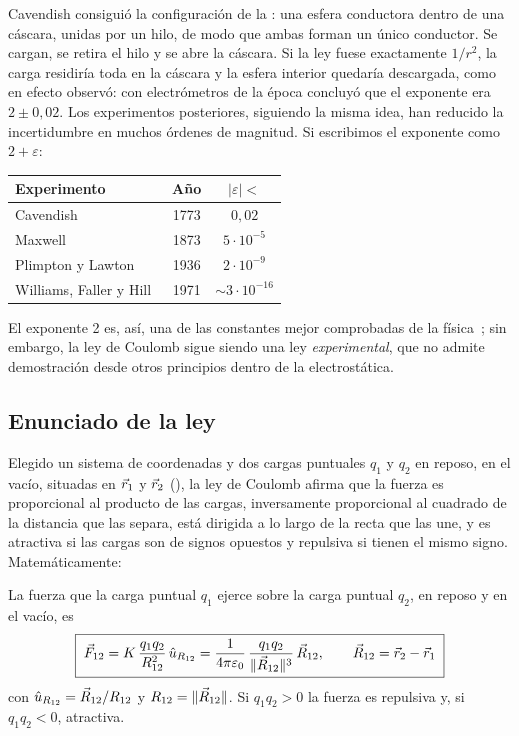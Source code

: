Cavendish consiguió la configuración de la : una esfera conductora dentro de
una cáscara, unidas por un hilo, de modo que ambas forman un único conductor. Se cargan, se retira
el hilo y se abre la cáscara. Si la ley fuese exactamente $1/r^{2}$, la carga residiría
toda en la cáscara y la esfera interior quedaría descargada, como en efecto observó: con electrómetros de
la época concluyó que el exponente era $2\pm0{,}02$. Los experimentos posteriores, siguiendo la misma idea, han
reducido la incertidumbre en muchos órdenes de magnitud. Si escribimos el exponente como $2+\varepsilon$:
\begin{center}\small
\renewcommand{\arraystretch}{1.25}
\begin{tabular}{@{}lcc@{}}
\toprule
Experimento & Año & $\lvert\varepsilon\rvert<$\\
\midrule
Cavendish~\cite{CAVENDISH-ELEC} & 1773 & $0{,}02$\\
Maxwell~\cite{MAXWELL} & 1873 & $5\cdot10^{-5}$\\
Plimpton y Lawton~\cite{PLIMPTON} & 1936 & $2\cdot10^{-9}$\\
Williams, Faller y Hill~\cite{WILLIAMS} & 1971 & $\sim3\cdot10^{-16}$\\
\bottomrule
\end{tabular}
\end{center}
El exponente 2 es, así, una de las constantes mejor comprobadas de la física~\cite{FEYNMAN}; sin embargo, la ley de Coulomb
sigue siendo una ley \emph{experimental}, que no admite demostración desde otros principios dentro de
la electrostática.

\subsection{Enunciado de la ley}\label{sec:coulomb-ley}
Elegido un sistema de coordenadas y dos cargas puntuales $q_1$ y $q_2$ en reposo, en el vacío, situadas
en $\vec{r}_1$ y $\vec{r}_2$ (), la ley de Coulomb afirma que la fuerza es proporcional al
producto de las cargas, inversamente proporcional al cuadrado de la distancia que las separa, está dirigida
a lo largo de la recta que las une, y es atractiva si las cargas son de signos opuestos y repulsiva si
tienen el mismo signo. Matemáticamente:

\begin{definicion}\label{def:coulomb}
La fuerza que la carga puntual $q_1$ ejerce sobre la carga puntual $q_2$, en reposo y en el vacío, es
\begin{equation}\label{eq:coulomb}
  \boxed{\;\vec{F}_{12}=K\,\frac{q_1q_2}{R_{12}^{2}}\,\hat{u}_{R_{12}}
  =\frac{1}{4\pi\varepsilon_{0}}\,\frac{q_1q_2}{\lVert \vec{R}_{12}\rVert^{3}}\,\vec{R}_{12},\qquad
  \vec{R}_{12}=\vec{r}_2-\vec{r}_1\;}
\end{equation}
con $\hat{u}_{R_{12}}=\vec{R}_{12}/R_{12}$ y $R_{12}=\lVert \vec{R}_{12}\rVert$. Si $q_1q_2>0$ la fuerza es
repulsiva y, si $q_1q_2<0$, atractiva.
\end{definicion}

